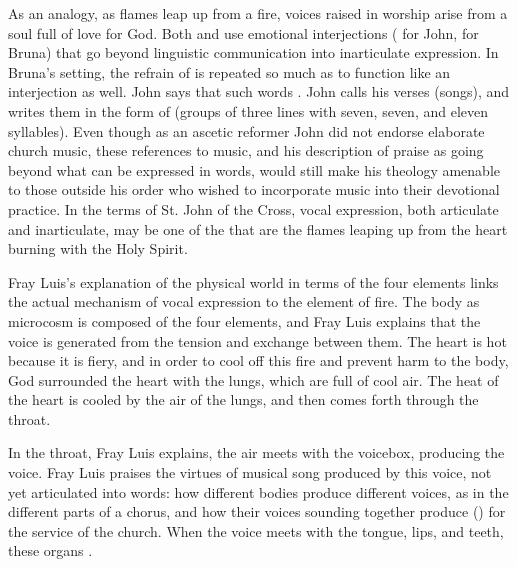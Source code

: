 As an analogy, as flames leap up from a fire, voices raised in worship arise from a soul full of love for God.
Both  and  use emotional interjections ( for John,  for Bruna) that go beyond linguistic communication into inarticulate expression.
In Bruna's setting, the refrain of  is repeated so much as to function like an interjection as well.
John says that such words .%
	\autocite[790]{JuandelaCruz:Llama}
John calls his verses  (songs), and writes them in the form of  (groups of three lines with seven, seven, and eleven syllables).
Even though as an ascetic reformer John did not endorse elaborate church music, these references to music, and his description of praise as going beyond what can be expressed in words, would still make his theology amenable to those outside his order who wished to incorporate music into their devotional practice.
In the terms of St. John of the Cross, vocal expression, both articulate and inarticulate, may be one of the  that are the flames leaping up from the heart burning with the Holy Spirit.

Fray Luis's explanation of the physical world in terms of the four elements links the actual mechanism of vocal expression to the element of fire.
The body as microcosm is composed of the four elements, and Fray Luis explains that the voice is generated from the tension and exchange between them.
The heart is hot because it is fiery, and in order to cool off this fire and prevent harm to the body, God surrounded the heart with the lungs, which are full of cool air. 
The heat of the heart is cooled by the air of the lungs, and then comes forth through the throat.%
	\autocite[435]{LuisdeGranada:Simbolo}

In the throat, Fray Luis explains, the air meets with the voicebox, producing the voice.
Fray Luis praises the virtues of musical song produced by this voice, not yet articulated into words:
how different bodies produce different voices, as in the different parts of a chorus, and how their voices sounding together produce  () for the service of the church.%
	\autocite[434]{LuisdeGranada:Simbolo}
When the voice meets with the tongue, lips, and teeth, these organs 
	.%
	\autocite[435]{LuisdeGranada:Simbolo}

